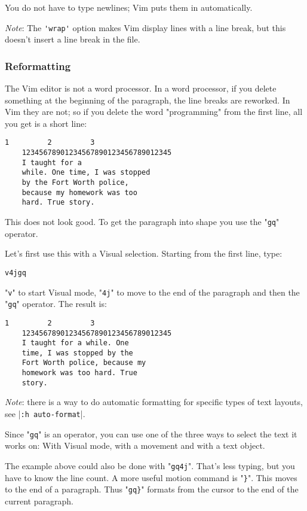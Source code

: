 You do not have to type newlines; Vim puts them in automatically.

\emph{Note}: The \verb!'wrap'! option makes Vim display lines with a line break, but this doesn't insert a line break in the file.
\subsubsection{Reformatting}
The Vim editor is not a word processor.
In a word processor, if you delete something at the beginning of the paragraph, the line breaks are reworked.
In Vim they are not; so if you delete the word "programming" from the first line, all you get is a short line:

\begin{Verbatim}[samepage=true]
             1         2         3
    12345678901234567890123456789012345
    I taught for a 
    while. One time, I was stopped 
    by the Fort Worth police, 
    because my homework was too 
    hard. True story. 
\end{Verbatim}

This does not look good.
To get the paragraph into shape you use the "\verb!gq!" operator.

Let's first use this with a Visual selection.
Starting from the first line, type:

\begin{Verbatim}[samepage=true]
 v4jgq
\end{Verbatim}

"\verb!v!" to start Visual mode, "\verb!4j!" to move to the end of the paragraph and then the "\verb!gq!" operator.
The result is:

\begin{Verbatim}[samepage=true]
             1         2         3
    12345678901234567890123456789012345
    I taught for a while. One 
    time, I was stopped by the 
    Fort Worth police, because my 
    homework was too hard. True 
    story. 
\end{Verbatim}

\emph{Note}: there is a way to do automatic formatting for specific types of text layouts, see |\verb!:h auto-format!|.

Since "\verb!gq!" is an operator, you can use one of the three ways to select the text it works on: With Visual mode, with a movement and with a text object.

The example above could also be done with "\verb!gq4j!".
That's less typing, but you have to know the line count.
A more useful motion command is "\verb!}!".
This moves to the end of a paragraph.
Thus "\verb!gq}!" formats from the cursor to the end of the current paragraph.

